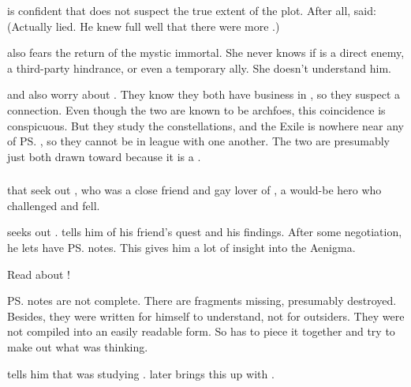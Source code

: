 \Teshrial{} is confident that \Ishnaruchaefir{} does not suspect the true extent of the \noggyal{} plot. 
After all, \Ishnaruchaefir{} said: 
(Actually \Ishnaruchaefir{} lied. 
 He knew full well that there were more \noggyaleth.)

\Achsah{} also fears the return of the mystic immortal. 
She never knows if \Ishnaruchaefir{} is a direct enemy, a third-party hindrance, or even a temporary ally. 
She doesn't understand him. 

\Achsah{} and \Teshrial{} also worry about \Secherdamon.
They know they both have business in \Malcur, so they suspect a connection. 
Even though the two are known to be archfoes, this coincidence is conspicuous. 
But they study the constellations, and the Exile is nowhere near any of \ps{\Secherdamon} \matrices, so they cannot be in league with one another. 
The two are presumably just both drawn toward \Malcur because it is a \nexus. 





\subsubsection{\Nemuragh}
\Menessiaraid{}  that \Teshrial{} seek out , who was a close friend and gay lover of \Lothagiel, a would-be hero who challenged \Ishnaruchaefir{} and fell. 

\Teshrial{} seeks out . 
\Nemuragh{} tells him of his friend's quest and his findings. 
After some negotiation, he lets \Teshrial{} have \ps{\Lothagiel} notes. 
This gives him a lot of insight into the Aenigma. 

Read about !

\ps{\Lothagiel} notes are not complete. 
There are fragments missing, presumably destroyed. 
Besides, they were written for himself to understand, not for outsiders. 
They were not compiled into an easily readable form. 
So \Teshrial{} has to piece it together and try to make out what \Lothagiel{} was thinking. 

\Nemuragh{} tells him that \Lothagiel{} was studying \WanderersInDarknessEmph. 
\Teshrial{} later brings this up with \Menessiaraid. 

